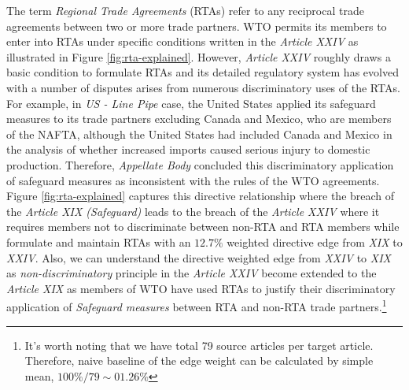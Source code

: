 The term \textit{Regional Trade Agreements} (RTAs)
refer to any reciprocal trade agreements between two or more trade partners. 
WTO permits its members to enter into RTAs under specific conditions written in the \textit{Article XXIV} 
as illustrated in 
Figure \ref{fig:rta-explained}.
However, \textit{Article XXIV} roughly draws a basic condition to formulate RTAs and its 
detailed regulatory system has evolved with a number of disputes arises 
from numerous discriminatory uses of the RTAs. For example,
in \textit{US - Line Pipe} case, 
the United States applied its safeguard measures to its trade partners excluding Canada and Mexico, who are members of the NAFTA, although 
the United States had included Canada and Mexico in the analysis of whether increased imports caused serious injury to domestic production.
Therefore, \textit{Appellate Body} concluded this discriminatory application of safeguard measures as inconsistent with the rules of the WTO agreements. 
Figure \ref{fig:rta-explained} 
captures this directive relationship 
where the breach of the \textit{Article XIX (Safeguard)} leads to the breach of the \textit{Article XXIV} 
where it requires members not to discriminate between non-RTA and RTA members while formulate and maintain RTAs with an $12.7\%$ weighted directive edge 
from \textit{XIX} to \textit{XXIV}. Also, we can understand the directive weighted edge from \textit{XXIV} to \textit{XIX} as \textit{non-discriminatory} 
principle in the \textit{Article XXIV} become 
extended to the \textit{Article XIX} as members of WTO have used RTAs to justify their discriminatory application of \textit{Safeguard measures} between RTA and non-RTA trade partners.\footnote{It's worth noting that we have total 79 source articles per target article. Therefore, naive baseline of the edge weight can be calculated by simple mean, $100\% / 79 \sim 01.26\%$}

